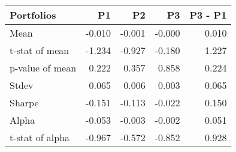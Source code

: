 \begin{tabular}{lrrrr}
\toprule
Portfolios & P1 & P2 & P3 & P3 - P1 \\
\midrule
Mean & -0.010 & -0.001 & -0.000 & 0.010 \\
t-stat of mean & -1.234 & -0.927 & -0.180 & 1.227 \\
p-value of mean & 0.222 & 0.357 & 0.858 & 0.224 \\
Stdev & 0.065 & 0.006 & 0.003 & 0.065 \\
Sharpe & -0.151 & -0.113 & -0.022 & 0.150 \\
Alpha & -0.053 & -0.003 & -0.002 & 0.051 \\
t-stat of alpha & -0.967 & -0.572 & -0.852 & 0.928 \\
\bottomrule
\end{tabular}

